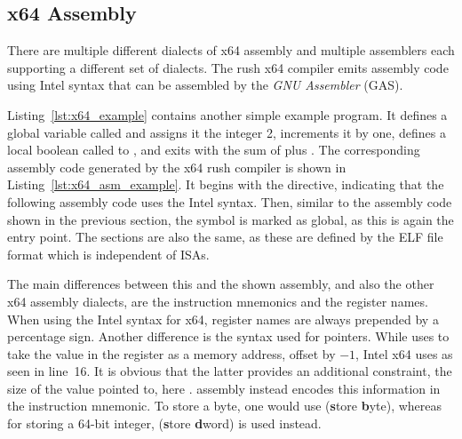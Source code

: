\subsection{x64 Assembly}


There are multiple different dialects of x64 assembly and multiple assemblers each supporting a different set of dialects.
The rush x64 compiler emits assembly code using Intel syntax that can be assembled by the \emph{GNU Assembler} (GAS).

Listing~\ref{lst:x64_example} contains another simple example program.
It defines a global variable called  and assigns it the integer 2, increments it by one, defines a local boolean called  to , and exits with the sum of  plus .
The corresponding assembly code generated by the x64 rush compiler is shown in Listing~\ref{lst:x64_asm_example}.
It begins with the  directive, indicating that the following assembly code uses the Intel syntax.
Then, similar to the \riscv{} assembly code shown in the previous section, the  symbol is marked as global, as this is again the entry point.
The sections are also the same, as these are defined by the ELF file format which is independent of ISAs.


The main differences between this and the shown \riscv{} assembly, and also the other x64 assembly dialects, are the instruction mnemonics and the register names.
When using the Intel syntax for x64, register names are always prepended by a percentage sign.
Another difference is the syntax used for pointers.
While \riscv{} uses  to take the value in the  register as a memory address, offset by $-1$, Intel x64 uses  as seen in line~16.
It is obvious that the latter provides an additional constraint, the size of the value pointed to, here .
\riscv{} assembly instead encodes this information in the instruction mnemonic.
To store a byte, one would use  (\textbf{s}tore \textbf{b}yte), whereas for storing a 64-bit integer,  (\textbf{s}tore \textbf{d}word) is used instead.

